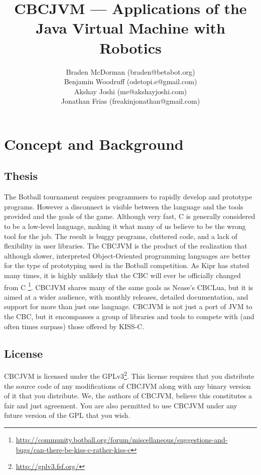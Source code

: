 \documentclass[10pt,letterpaper]{article}
\title{CBCJVM --- Applications of the Java Virtual Machine with Robotics}
\author{Braden McDorman (braden@betabot.org)\\
Benjamin Woodruff (odetopi.e@gmail.com)\\
Akshay Joshi (me@akshayjoshi.com)\\
Jonathan Frias (freakinjonathan@gmail.com)}
\newcommand{\urlfootnote}[1]{\footnote{\url{#1}}}
\begin{document}
\maketitle

\section{Concept and Background}

\subsection{Thesis}

The Botball tournament requires programmers to rapidly develop and prototype programs. However a disconnect is visible between the language and the tools provided and the goals of the game. Although very fast, C is generally considered to be a low-level language, making it what many of us believe to be the wrong tool for the job. The result is buggy programs, cluttered code, and a lack of flexibility in user libraries. The CBCJVM is the product of the realization that although slower, interpreted Object-Oriented programming languages are better for the type of prototyping used in the Botball competition. As Kipr has stated many times, it is highly unlikely that the CBC will ever be officially changed from C \urlfootnote{http://community.botball.org/forum/miscellaneous/suggestions-and-bugs/can-there-be-kiss-c-rather-kiss-c}. CBCJVM shares many of the same goals as Nease's CBCLua, but it is aimed at a wider audience, with monthly releases, detailed documentation, and support for more than just one language. CBCJVM is not just a port of JVM to the CBC, but it encompasses a group of libraries and tools to compete with (and often times surpass) those offered by KISS-C.



\subsection{License}

CBCJVM is licensed under the GPLv3\urlfootnote{http://gplv3.fsf.org/}. This license requires that you distribute the source code of any modifications of CBCJVM along with any binary version of it that you distribute. We, the authors of CBCJVM, believe this constitutes a fair and just agreement. You are also permitted to use CBCJVM under any future version of the GPL that you wish.
\end{document}
